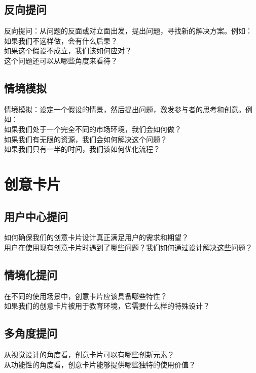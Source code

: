 \documentclass[12pt]{book}
\begin{document}
\subsection{反向提问}
反向提问：从问题的反面或对立面出发，提出问题，寻找新的解决方案。例如：\\
如果我们不这样做，会有什么后果？\\
如果这个假设不成立，我们该如何应对？\\
这个问题还可以从哪些角度来看待？\\

\subsection{情境模拟}
情境模拟：设定一个假设的情景，然后提出问题，激发参与者的思考和创意。例如：\\
如果我们处于一个完全不同的市场环境，我们会如何做？\\
如果我们有无限的资源，我们会如何解决这个问题？\\
如果我们只有一半的时间，我们该如何优化流程？\\

\section{创意卡片}
\subsection{用户中心提问}
如何确保我们的创意卡片设计真正满足用户的需求和期望？\\
用户在使用现有创意卡片时遇到了哪些问题？我们如何通过设计解决这些问题？\\

\subsection{情境化提问}
在不同的使用场景中，创意卡片应该具备哪些特性？\\
如果我们的创意卡片被用于教育环境，它需要什么样的特殊设计？\\


\subsection{多角度提问}
从视觉设计的角度看，创意卡片可以有哪些创新元素？\\
从功能性的角度看，创意卡片能够提供哪些独特的使用价值？\\
\end{document}
